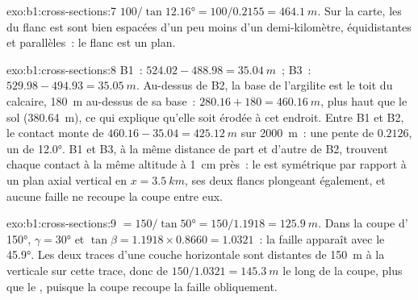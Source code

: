 \begin{solution}{exo:b1:cross-sections:7}
$100/\tan\ang{12.16} = 100/0.2155 = \qty{464.1}{m}$. Sur la carte, les
 du flanc est sont bien espacées d'un peu moins d'un
demi-kilomètre, équidistantes et parallèles~: le flanc est un plan.
\end{solution}

\begin{solution}{exo:b1:cross-sections:8}
B1~: $524.02 - 488.98 = \qty{35.04}{m}$~; B3~: $529.98 - 494.93 =
\qty{35.05}{m}$. Au-dessus de B2, la base de l'argilite est le toit du
calcaire, \qty{180}{m} au-dessus de sa base~: $280.16 + 180 = \qty{460.16}{m}$,
plus haut que le sol (\qty{380.64}{m}), ce qui explique qu'elle soit érodée à cet
endroit. Entre B1 et B2, le contact monte de $460.16 - 35.04 = \qty{425.12}{m}$
sur \qty{2000}{m}~: une pente de $0.2126$, un  de \ang{12.0}. B1
et B3, à la même distance de part et d'autre de B2, trouvent chaque contact à la
même altitude à \qty{1}{cm} près~: le  est symétrique par rapport à un plan
axial vertical en $x = \qty{3.5}{km}$, ses deux flancs plongeant également, et
aucune faille ne recoupe la coupe entre eux.
\end{solution}

\begin{solution}{exo:b1:cross-sections:9}
 $= 150/\tan\ang{50} = 150/1.1918 = \qty{125.9}{m}$. Dans la
coupe d' \ang{150}, $\gamma = \ang{30}$ et $\tan\beta = 1.1918\times0.8660 =
1.0321$~: la faille apparaît avec le  \ang{45.9}. Les deux traces
d'une couche horizontale sont distantes de \qty{150}{m} à la verticale sur cette
trace, donc de $150/1.0321 = \qty{145.3}{m}$ le long de la coupe, plus que le
, puisque la coupe recoupe la faille obliquement.
\end{solution}


